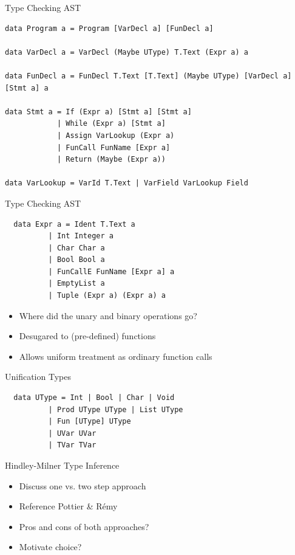 \documentclass[dvipsnames,aspectratio=169]{beamer}
\begin{document}
\begin{frame}[fragile]{Type Checking AST}

  \begin{verbatim}
data Program a = Program [VarDecl a] [FunDecl a]

data VarDecl a = VarDecl (Maybe UType) T.Text (Expr a) a

data FunDecl a = FunDecl T.Text [T.Text] (Maybe UType) [VarDecl a] [Stmt a] a

data Stmt a = If (Expr a) [Stmt a] [Stmt a]
            | While (Expr a) [Stmt a]
            | Assign VarLookup (Expr a)
            | FunCall FunName [Expr a]
            | Return (Maybe (Expr a))

data VarLookup = VarId T.Text | VarField VarLookup Field

\end{verbatim}

\end{frame}


\begin{frame}[fragile]{Type Checking AST}

  \begin{verbatim}
  data Expr a = Ident T.Text a
          | Int Integer a
          | Char Char a
          | Bool Bool a
          | FunCallE FunName [Expr a] a
          | EmptyList a
          | Tuple (Expr a) (Expr a) a
  \end{verbatim}

  \begin{itemize}
    \item Where did the unary and binary operations go?
    \item Desugared to (pre-defined) functions
    \item Allows uniform treatment as ordinary function calls
  \end{itemize}


\end{frame}


\begin{frame}[fragile]{Unification Types}

  \begin{verbatim}
  data UType = Int | Bool | Char | Void
          | Prod UType UType | List UType
          | Fun [UType] UType
          | UVar UVar
          | TVar TVar
  \end{verbatim}

\end{frame}


\begin{frame}{Hindley-Milner Type Inference}

  \begin{itemize}
    \item Discuss one vs. two step approach
    \item Reference Pottier \& Rémy
    \item Pros and cons of both approaches?
    \item Motivate choice?
  \end{itemize}

\end{frame}
\end{document}
